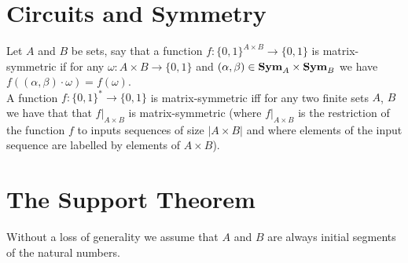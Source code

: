 \documentclass[12pt]{report}
\newcommand{\sym}{\text{\textbf{Sym}}}
\begin{document}
\section{Circuits and Symmetry}
\begin{definition}
  Let $A$ and $B$ be sets, say that a function $f: \{ 0,1 \}^{A \times B}
  \rightarrow \{ 0,1 \}$ is matrix-symmetric if for any $\omega: A \times B
  \rightarrow \{0, 1\}$ and $(\alpha, \beta) \in \sym_A \times \sym_B$ we have
  $f((\alpha, \beta)\cdot \omega) = f (\omega)$.
  \\
  A function $f: \{0,1\}^* \rightarrow \{0,1\}$ is matrix-symmetric iff for any
  two finite sets $A$, $B$ we have that that $f|_{A \times B}$ is
  matrix-symmetric (where $f|_{A \times B}$ is the restriction of the function
  $f$ to inputs sequences of size $\vert A \times B \vert$ and where elements of
  the input sequence are labelled by elements of $A \times B$).
\end{definition}


\section{The Support Theorem}

Without a loss of generality we assume that $A$ and $B$ are always initial
segments of the natural numbers.


\end{document}
